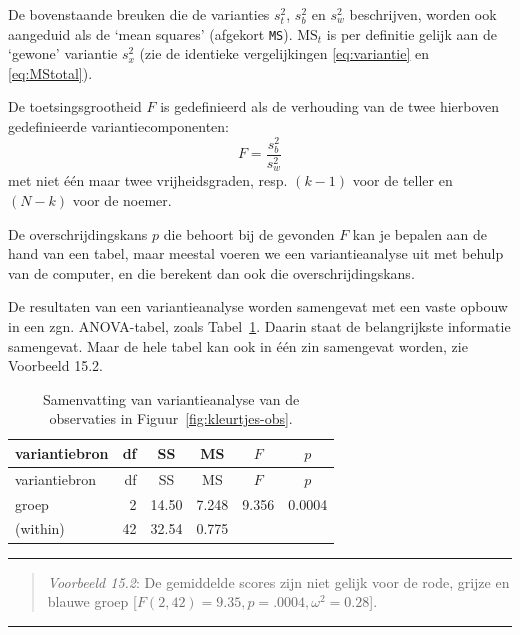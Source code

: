 \documentclass[
]{book}
\begin{document}
De bovenstaande breuken die de varianties \(s^2_t\), \(s^2_b\) en \(s^2_w\)
beschrijven, worden ook aangeduid als de `mean squares' (afgekort \texttt{MS}).
\(\textrm{MS}_{t}\) is per definitie gelijk aan de `gewone' variantie
\(s^2_x\) (zie de identieke vergelijkingen
\eqref{eq:variantie} en
\eqref{eq:MStotal}).

De toetsingsgrootheid \(F\) is gedefinieerd als de verhouding van de twee
hierboven gedefinieerde variantiecomponenten:
\begin{equation}
  \label{eq:Fratio}
    F = \frac{ s^2_b } { s^2_w }
\end{equation}
met niet één maar twee
vrijheidsgraden, resp. \((k-1)\) voor de teller en \((N-k)\) voor de noemer.

De overschrijdingskans \(p\) die behoort bij de gevonden \(F\) kan je
bepalen aan de hand van een tabel, maar meestal voeren we een
variantieanalyse uit met behulp van de computer, en die berekent dan ook
die overschrijdingskans.

De resultaten van een variantieanalyse worden samengevat met een vaste
opbouw in een zgn. ANOVA-tabel, zoals
Tabel~\ref{tab:kleurtjes-anova}. Daarin staat de belangrijkste
informatie samengevat. Maar de hele tabel kan ook in één zin samengevat
worden, zie Voorbeeld 15.2.

\begin{longtable}[]{@{}lrcccc@{}}
\caption{\label{tab:kleurtjes-anova} Samenvatting van variantieanalyse van de observaties in Figuur~\ref{fig:kleurtjes-obs}.}\tabularnewline
\toprule
variantiebron & df & SS & MS & \(F\) & \(p\)\tabularnewline
\midrule
\endfirsthead
\toprule
variantiebron & df & SS & MS & \(F\) & \(p\)\tabularnewline
\midrule
\endhead
groep & 2 & 14.50 & 7.248 & 9.356 & 0.0004\tabularnewline
(within) & 42 & 32.54 & 0.775 & &\tabularnewline
\bottomrule
\end{longtable}

\begin{center}\rule{0.5\linewidth}{0.5pt}\end{center}

\begin{quote}
\emph{Voorbeeld 15.2}:
De gemiddelde scores zijn niet gelijk voor de rode, grijze en blauwe groep
{[}\(F(2,42) = 9.35, p = .0004, \omega^2 = 0.28\){]}.
\end{quote}

\begin{center}\rule{0.5\linewidth}{0.5pt}\end{center}
\end{document}
